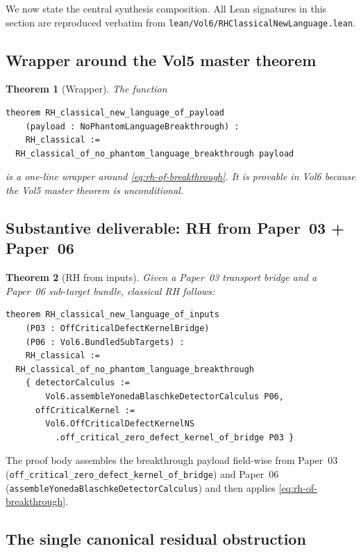 \documentclass[11pt]{article}
\theoremstyle{plain}
\newtheorem{theorem}{Theorem}[section]
\theoremstyle{definition}
\theoremstyle{remark}
\newcommand{\code}[1]{\texttt{#1}}
\begin{document}
We now state the central synthesis composition.  All Lean signatures
in this section are reproduced verbatim from
\code{lean/Vol6/RHClassicalNewLanguage.lean}.

\subsection{Wrapper around the Vol5 master theorem}

\begin{theorem}[Wrapper]
\label{thm:wrapper}
The function
\begin{lstlisting}
theorem RH_classical_new_language_of_payload
    (payload : NoPhantomLanguageBreakthrough) :
    RH_classical :=
  RH_classical_of_no_phantom_language_breakthrough payload
\end{lstlisting}
is a one-line wrapper around \eqref{eq:rh-of-breakthrough}. It is
provable in Vol6 because the Vol5 master theorem is unconditional.
\end{theorem}

\subsection{Substantive deliverable: RH from Paper~03 + Paper~06}

\begin{theorem}[RH from inputs]
\label{thm:rh-from-inputs}
Given a Paper~03 transport bridge and a Paper~06 sub-target bundle,
classical RH follows:
\begin{lstlisting}
theorem RH_classical_new_language_of_inputs
    (P03 : OffCriticalDefectKernelBridge)
    (P06 : Vol6.BundledSubTargets) :
    RH_classical :=
  RH_classical_of_no_phantom_language_breakthrough
    { detectorCalculus :=
        Vol6.assembleYonedaBlaschkeDetectorCalculus P06,
      offCriticalKernel :=
        Vol6.OffCriticalDefectKernelNS
          .off_critical_zero_defect_kernel_of_bridge P03 }
\end{lstlisting}
\end{theorem}

The proof body assembles the breakthrough payload field-wise from
Paper~03 (\code{off\_critical\_zero\_defect\_kernel\_of\_bridge}) and
Paper~06 (\code{assembleYonedaBlaschkeDetectorCalculus}) and then
applies \eqref{eq:rh-of-breakthrough}.

\subsection{The single canonical residual obstruction}
\end{document}
